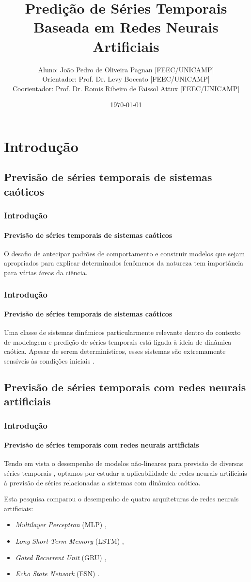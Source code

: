 \documentclass[aspectratio=169]{beamer}
\title[XXIX Congresso de Iniciação Científica - UNICAMP]{
 Predição de Séries Temporais Baseada em Redes Neurais
Artificiais}
\author[João Pedro O. Pagnan]{ \footnotesize
  Aluno: João Pedro de Oliveira Pagnan [FEEC/UNICAMP]\\
  Orientador: Prof. Dr. Levy Boccato [FEEC/UNICAMP]\\
  Coorientador: Prof. Dr. Romis Ribeiro de Faissol Attux [FEEC/UNICAMP]\\\medskip
  }
\institute[Universidade Estadual de Campinas ]{
  Departamento de Engenharia de Computação e Automação Industrial -- DCA \\
  }
\date{\scriptsize \today}
\begin{document}
\begin{frame}
  \titlepage
\end{frame}

\section{Introdução}
\subsection{Previsão de séries temporais de sistemas caóticos}
\begin{frame}
    \frametitle{Introdução}
    \framesubtitle{Previsão de séries temporais de sistemas caóticos}
    \justifying O desafio de antecipar padrões de comportamento e construir modelos que sejam apropriados para explicar determinados fenômenos da natureza tem importância para várias áreas da ciência.
\end{frame}

\begin{frame}
    \frametitle{Introdução}
    \framesubtitle{Previsão de séries temporais de sistemas caóticos}
    \justifying Uma classe de sistemas dinâmicos particularmente relevante dentro do contexto de modelagem e predição de séries temporais está ligada à ideia de dinâmica caótica. Apesar de serem determinísticos, esses sistemas são extremamente sensíveis às condições iniciais \cite{fiedler1994caos}.
\end{frame}


\subsection{Previsão de séries temporais com redes neurais artificiais}

\begin{frame}
    \frametitle{Introdução}
    \framesubtitle{Previsão de séries temporais com redes neurais artificiais}
    \justifying Tendo em vista o desempenho de modelos não-lineares para previsão de diversas séries temporais \cite{connor1994recurrent}, optamos por estudar a aplicabilidade de redes neurais artificiais à previsão de séries relacionadas a sistemas com dinâmica caótica. 
    
    Esta pesquisa comparou o desempenho de quatro arquiteturas de redes neurais artificiais:
    
    \begin{itemize}[<+-| alert@+>]
	\item \textit{Multilayer Perceptron} (MLP) \cite{rosenblatt1958perceptron},
	\item \textit{Long Short-Term Memory} (LSTM) \cite{connor1994recurrent},
	\item \textit{Gated Recurrent Unit} (GRU) \cite{cho2014learning},
	\item \textit{Echo State Network} (ESN) \cite{jaeger2007echo}.
    \end{itemize} 
\end{frame}
\end{document}
